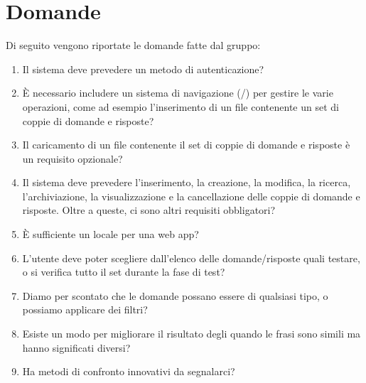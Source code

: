 \documentclass[a4paper, 12pt]{article}
\begin{document}
\newpage

\section{Domande}
\label{sec:Domande}
Di seguito vengono riportate le domande fatte dal gruppo:
\begin{enumerate}
    \item Il sistema deve prevedere un metodo di autenticazione?
    \item È necessario includere un sistema di navigazione (/) per gestire le varie operazioni, come ad esempio l'inserimento di un file contenente un set di coppie di domande e risposte?
    \item Il caricamento di un file contenente il set di coppie di domande e risposte è un requisito opzionale?
    \item Il sistema deve prevedere l'inserimento, la creazione, la modifica, la ricerca, l'archiviazione, la visualizzazione e la cancellazione delle coppie di domande e risposte. Oltre a queste, ci sono altri requisiti obbligatori?
    \item È sufficiente un  locale per una web app?
    \item L'utente deve poter scegliere dall'elenco delle domande/risposte quali testare, o si verifica tutto il set durante la fase di test?
    \item Diamo per scontato che le domande possano essere di qualsiasi tipo, o possiamo applicare dei filtri?
    \item Esiste un modo per migliorare il risultato degli  quando le frasi sono simili ma hanno significati diversi?
    \item Ha metodi di confronto innovativi da segnalarci?
\end{enumerate}
\end{document}
